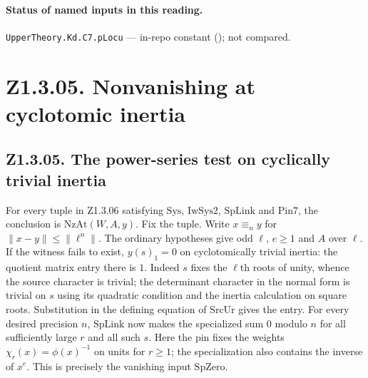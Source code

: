 
\paragraph{Status of named inputs in this reading.}
\noindent\nolinkurl{UpperTheory.Kd.C7.pLocu} --- in-repo constant (); not compared.\par

\section*{Z1.3.05. Nonvanishing at cyclotomic inertia}

\subsection{Z1.3.05. The power-series test on cyclically trivial inertia}\label{r5:Z1.3.05}
For every tuple in Z1.3.06 satisfying $\mathrm{Sys}$, $\mathrm{IwSys2}$, $\mathrm{SpLink}$ and $\mathrm{Pin7}$, the conclusion is $\mathrm{NzAt}(W,A,y)$. Fix the tuple. Write $x\equiv_n y$ for $\lVert x-y\rVert\le\lVert\ell^n\rVert$. The ordinary hypotheses give odd $\ell$, $e\ge1$ and $A$ over $\ell$. If the witness fails to exist, $y(s)_1=0$ on cyclotomically trivial inertia: the quotient matrix entry there is $1$. Indeed $s$ fixes the $\ell$th roots of unity, whence the source character is trivial; the determinant character in the normal form is trivial on $s$ using its quadratic condition and the inertia calculation on square roots. Substitution in the defining equation of $\mathrm{SrcUr}$ gives the entry. For every desired precision $n$, $\mathrm{SpLink}$ now makes the specialized sum $0$ modulo $n$ for all sufficiently large $r$ and all such $s$. Here the pin fixes the weights $\chi_r(x)=\phi(x)^{-1}$ on units for $r\ge1$; the specialization also contains the inverse of $x^e$. This is precisely the vanishing input $\mathrm{SpZero}$.

